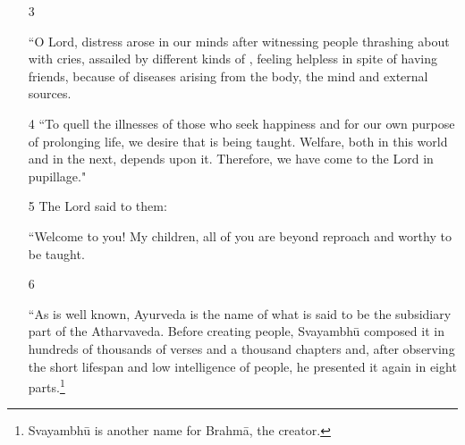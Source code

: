 \documentclass[12pt]{article}
\begin{document}
\begin{itemize}
    \item[3]

“O Lord, distress arose in our minds after witnessing people thrashing about with
cries, assailed by different kinds of , 
feeling helpless in spite 
of having friends, because of diseases arising from the body, the mind and
external sources.


    

    \let\uncertain\texttt
    
\item[4]    
“To quell the illnesses of those who seek happiness and for our own purpose of
prolonging life, we desire  that is being
taught.  Welfare, both in this world and in
    the next, depends upon it. Therefore, we have come to the Lord in pupillage." %


\item[5] The Lord said to them:

“Welcome to you!  My children, all of you are beyond reproach and worthy 
to be taught.
   
    
    \item[6] 
%    
    
    “As is well known, Ayurveda is the name of what is said to be the subsidiary
part of the Atharvaveda.   Before creating people, Svayambhū composed it in
hundreds of thousands of verses and a thousand chapters and, after observing the
short lifespan and low intelligence of people, he presented it again in eight
parts.\footnote{Svayambhū is another name for Brahmā, the creator.}
    

\end{itemize}
\end{document}
